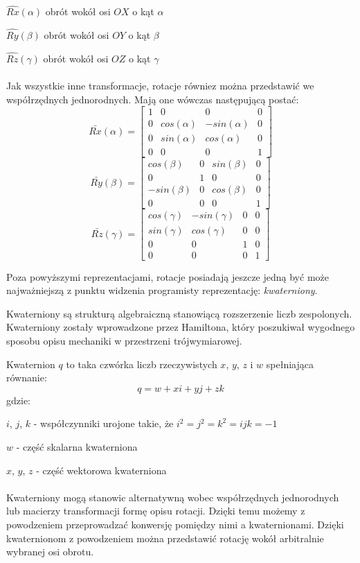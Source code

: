 \documentclass[licencjacka]{pracamgr}
\begin{document}
$\hat{Rx}(\alpha)$ obrót wokół osi $OX$ o kąt $\alpha$

$\hat{Ry}(\beta)$ obrót wokół osi $OY$ o kąt $\beta$

$\hat{Rz}(\gamma)$ obrót wokół osi $OZ$ o kąt $\gamma$
\\
\\
Jak wszystkie inne transformacje, rotacje równiez można przedstawić we współrzędnych jednorodnych. Mają one wówczas następującą postać:
$$
\bar{Rx}(\alpha) = 
\begin{bmatrix}
1 & 0 & 0 & 0 \\
0 & cos(\alpha) & -sin(\alpha) & 0 \\
0 & sin(\alpha) & cos(\alpha) & 0 \\
0 & 0 & 0 & 1
\end{bmatrix}
$$
$$
\bar{Ry}(\beta) = 
\begin{bmatrix}
cos(\beta) & 0 & sin(\beta) & 0 \\
0 & 1 & 0 & 0 \\
-sin(\beta) & 0 & cos(\beta) & 0 \\
0 & 0 & 0 & 1
\end{bmatrix}
$$
$$
\bar{Rz}(\gamma) = 
\begin{bmatrix}
cos(\gamma) & -sin(\gamma) & 0 & 0 \\
sin(\gamma) & cos(\gamma) & 0 & 0 \\
0 & 0 & 1 & 0 \\
0 & 0 & 0 & 1
\end{bmatrix}
$$

Poza powyższymi reprezentacjami, rotacje posiadają jeszcze jedną być może najważniejszą z punktu widzenia programisty reprezentację: \textit{kwaterniony}.

Kwaterniony są strukturą algebraiczną stanowiącą rozszerzenie liczb zespolonych. Kwaterniony zostały wprowadzone przez Hamiltona, który poszukiwał wygodnego sposobu opisu mechaniki w przestrzeni trójwymiarowej. 

Kwaternion $q$ to taka czwórka liczb rzeczywistych $x$, $y$, $z$ i $w$ spełniająca równanie:
$$
q=w+xi+yj+zk
$$
gdzie:

$i$, $j$, $k$ - współczynniki urojone takie, że $i^2=j^2=k^2=ijk=-1$

$w$ - część skalarna kwaterniona

$x$, $y$, $z$ - część wektorowa kwaterniona
\\
\\
Kwaterniony mogą stanowic alternatywną wobec współrzędnych jednorodnych lub macierzy transformacji formę opisu rotacji. Dzięki temu możemy z powodzeniem przeprowadzać konwersję pomiędzy nimi a kwaternionami. Dzięki kwaternionom z powodzeniem można przedstawić rotację wokół arbitralnie wybranej osi obrotu. 
\end{document}
